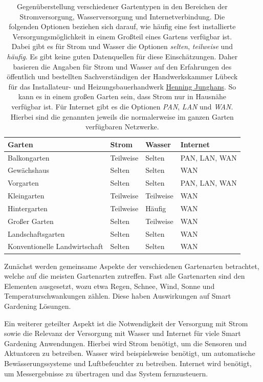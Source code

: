 \begin{table}[!htb]
	\centering
	\caption[Gegenüberstellung von Gartentypen: Strom, Wasser und Internet.]{
		Gegenüberstellung verschiedener Gartentypen in den Bereichen der Stromversorgung, Wasserversorgung und Internetverbindung.
		Die folgenden Optionen beziehen sich darauf, wie häufig eine fest installierte Versorgungsmöglichkeit in einem Großteil eines Gartens verfügbar ist.
		Dabei gibt es für Strom und Wasser die Optionen \emph{selten}, \emph{teilweise} und \emph{häufig}.
		Es gibt keine guten Datenquellen für diese Einschätzungen.
		Daher basieren die Angaben für Strom und Wasser auf den Erfahrungen des öffentlich und bestellten Sachverständigen der Handwerkskammer Lübeck für das Installateur- und Heizungsbauerhandwerk \href{https://www.junghans-heizung.de/über-uns/}{Henning Junghans}.
		So kann es in einem großen Garten sein, dass Strom nur in Hausnähe verfügbar ist.
		Für Internet gibt es die Optionen \emph{PAN}, \emph{LAN} und \emph{WAN}.
		Hierbei sind die genannten jeweils die normalerweise im ganzen Garten verfügbaren Netzwerke.
		}\label{tab:gartenarten}
	\begin{tabular}{llll}
		Garten							& Strom 	& Wasser	& Internet		\\\hline
		Balkongarten					& Teilweise	& Selten	& PAN, LAN, WAN	\\
		Gewächshaus						& Selten	& Selten	& WAN			\\
		Vorgarten						& Selten	& Selten	& PAN, LAN, WAN	\\
		Kleingarten						& Teilweise	& Teilweise	& WAN			\\
		Hintergarten					& Teilweise	& Häufig	& WAN			\\
		Großer Garten					& Selten	& Teilweise	& WAN			\\
		Landschaftsgarten				& Selten	& Selten	& WAN			\\
		Konventionelle Landwirtschaft	& Selten	& Selten~\cite{BewFlaechen,BewFlaechenPresse}	& WAN
	\end{tabular}
\end{table}

Zunächst werden gemeinsame Aspekte der verschiedenen Gartenarten betrachtet, welche auf die meisten Gartenarten zutreffen.
Fast alle Gartenarten sind den Elementen ausgesetzt, wozu etwa Regen, Schnee, Wind, Sonne und Temperaturschwankungen zählen.
Diese haben Auswirkungen auf Smart Gardening Lösungen.

Ein weiterer geteilter Aspekt ist die Notwendigkeit der Versorgung mit Strom sowie die Relevanz der Versorgung mit Wasser und Internet für viele Smart Gardening Anwendungen.
Hierbei wird Strom benötigt, um die Sensoren und Aktuatoren zu betreiben.
Wasser wird beispielsweise benötigt, um automatische Bewässerungssysteme und Luftbefeuchter zu betreiben.
Internet wird benötigt, um Messergebnisse zu übertragen und das System fernzusteuern.

